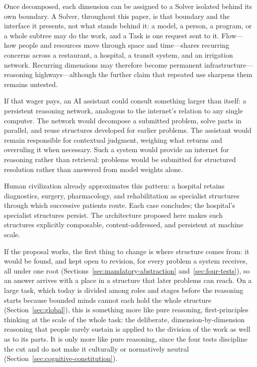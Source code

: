 \documentclass[11pt]{article}
\begin{document}
Once decomposed, each dimension can be assigned to a Solver isolated behind its own boundary. A Solver, throughout this paper, is that boundary and the interface it presents, not what stands behind it: a model, a person, a program, or a whole subtree may do the work, and a Task is one request sent to it. Flow---how people and resources move through space and time---shares recurring concerns across a restaurant, a hospital, a transit system, and an irrigation network. Recurring dimensions may therefore become permanent infrastructure---reasoning highways---although the further claim that repeated use sharpens them remains untested.

If that wager pays, an AI assistant could consult something larger than itself: a persistent reasoning network, analogous to the internet's relation to any single computer. The network would decompose a submitted problem, solve parts in parallel, and reuse structures developed for earlier problems. The assistant would remain responsible for contextual judgment, weighing what returns and overruling it when necessary. Such a system would provide an internet for reasoning rather than retrieval: problems would be submitted for structured resolution rather than answered from model weights alone.

Human civilization already approximates this pattern: a hospital retains diagnostics, surgery, pharmacology, and rehabilitation as specialist structures through which successive patients route. Each case concludes; the hospital's specialist structures persist. The architecture proposed here makes such structures explicitly composable, content-addressed, and persistent at machine scale.

If the proposal works, the first thing to change is where structure comes from: it would be found, and kept open to revision, for every problem a system receives, all under one root (Sections~\ref{sec:mandatory-abstraction} and~\ref{sec:four-tests}), so an answer arrives with a place in a structure that later problems can reach. On a large task, which today is divided among roles and stages before the reasoning starts because bounded minds cannot each hold the whole structure (Section~\ref{sec:global}), this is something more like pure reasoning, first-principles thinking at the scale of the whole task: the deliberate, dimension-by-dimension reasoning that people rarely sustain is applied to the division of the work as well as to its parts. It is only more like pure reasoning, since the four tests discipline the cut and do not make it culturally or normatively neutral (Section~\ref{sec:cognitive-constitution}).
\end{document}
